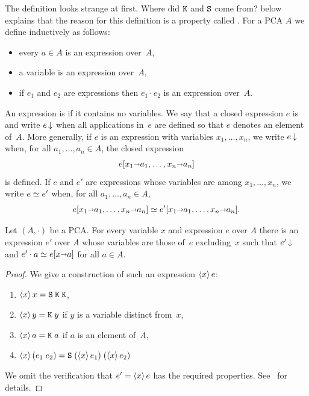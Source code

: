 \noindent
The definition looks strange at first. Where did $\mathtt{K}$ and $\mathtt{S}$
come from?  below explains
that the reason for this definition is a property called
.
%
For a PCA $A$ we define  inductively as
follows:
%
\begin{itemize}
\item every $a \in A$ is an expression over~$A$,
\item a variable is an expression over~$A$,
\item if $e_1$ and $e_2$ are expressions then $e_1 \cdot e_2$ is an
  expression over~$A$.
\end{itemize}
%
An expression is  if it contains no variables. We say
that a closed expression $e$ is  and write $e\,{\downarrow}$
when all applications in~$e$ are defined so that $e$ denotes an
element of~$A$. More generally, if $e$ is an expression with variables
$x_1, \ldots, x_n$, we write $e\,{\downarrow}$ when, for all $a_1, \ldots,
a_n \in A$, the closed expression
%
\begin{equation*}
  e[x_1 {\shortrightarrow} a_1, \ldots, x_n {\shortrightarrow} a_n]
\end{equation*}
%
is defined. If $e$ and $e'$ are expressions whose variables are among
$x_1, \ldots, x_n$, we write $e \simeq e'$ when, for all $a_1, \ldots,
a_n \in A$,
%
\begin{equation*}
  e[x_1 {\shortrightarrow} a_1, \ldots, x_n {\shortrightarrow} a_n] \simeq
  e'[x_1 {\shortrightarrow} a_1, \ldots, x_n {\shortrightarrow} a_n].
\end{equation*}

\begin{theorem}
  \label{th:combinatory-completeness}
  Let $(A, {\cdot})$ be a PCA. For every variable $x$ and expression
  $e$ over $A$ there is an expression $e'$ over $A$ whose variables
  are those of~$e$ excluding~$x$ such that $e'\,{\downarrow}$ and $e'
  \cdot a \simeq e[x {\shortrightarrow} a]$ for all $a \in A$.
\end{theorem}

\begin{proof}
  We give a construction of such an expression $\langle x \rangle\,e$:
  \begin{enumerate}
  \item $\langle x \rangle\,x = \mathtt{S}\; \mathtt{K}\; \mathtt{K}$,
  \item $\langle x \rangle\,y = \mathtt{K}\; y$ if $y$ is a variable distinct from~$x$,
  \item $\langle x \rangle\,a = \mathtt{K}\; a$ if $a$ is an element of~$A$,
  \item $\langle x \rangle\,(e_1\; e_2) = \mathtt{S}\; (\langle x \rangle\,e_1)\; (\langle x \rangle\,e_2)$
  \end{enumerate}
  We omit the verification that $e' = \langle x \rangle\,e$ has the required
  properties. See~ for details.
\end{proof}

